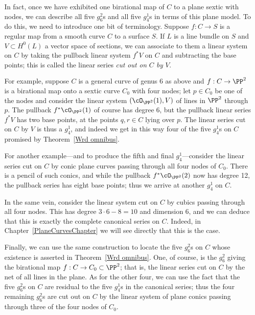 In fact, once we have exhibited one birational map of $C$ to a plane sextic with nodes, we can describe all five $g^2_6$s and all five $g^1_4$s in terms of this plane model. To do this, we need to introduce one bit of terminology. Suppose $f : C \to S$ is a regular map from a smooth curve $C$ to a surface $S$. If $L$ is a line bundle on $S$ and $V \subset H^0(L)$ a vector space of sections, we can associate to them a linear system on $C$ by taking the pullback linear system $f^*V$ on $C$ and subtracting the base points; this is called the linear series \emph{cut out on $C$ by $V$}.

For example, suppose $C$ is a general curve of genus 6 as above and $f : C \to \PP^2$ is a birational map onto a sextic curve $C_0$ with four nodes; let $p \in C_0$ be one of the nodes and consider the linear system $(\cO_{\PP^2}(1),V)$ of lines in $\PP^2$ through $p$. The pullback $f^*\cO_{\PP^2}(1)$ of course has degree 6, but the pullback linear series $f^*V$ has two base points, at the points $q, r \in C$ lying over $p$. The linear series cut on $C$ by $V$ is thus a $g^1_4$, and indeed we get in this way four of the five $g^1_4$s on $C$ promised by Theorem~\ref{Wrd omnibus}.

For another example---and to produce the fifth and final $g^1_4$---consider the linear series cut on $C$ by conic plane curves passing through all four nodes of $C_0$. There is a pencil of such conics, and while the pullback $f^*\cO_{\PP^2}(2)$ now has degree 12, the pullback series has eight base points; thus we arrive at another $g^1_4$ on $C$.

In the same vein, consider the linear system cut on $C$ by cubics passing through all four nodes. This has degree $3\cdot 6 - 8 = 10$ and dimension 6, and we can deduce that this is exactly the complete canonical series on $C$. Indeed, in Chapter~\ref{PlaneCurvesChapter} we will see directly that this is the case.

Finally, we can use the same construction to locate the five $g^2_6$s on $C$ whose existence is asserted in Theorem~\ref{Wrd omnibus}. One, of course, is the $g^2_6$ giving the birational map $f : C \to C_0 \subset \PP^2$; that is, the linear series cut on $C$ by the net of all lines in the plane. As for the other four, we can use the fact that the five $g^2_6$s on $C$ are residual to the five $g^1_4$s in the canonical series; thus the four remaining $g^2_6$s are cut out on $C$ by the linear system of plane conics passing through three of the four nodes of $C_0$.

